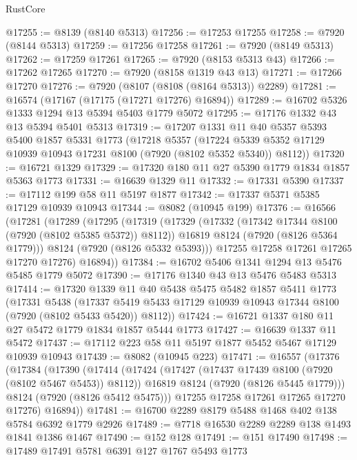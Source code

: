 \begin{lexlean}{RustCore}
\begin{coremodule}
@17255 := @8139 (@8140 @5313)
@17256 := @17253 @17255
@17258 := @7920 (@8144 @5313)
@17259 := @17256 @17258
@17261 := @7920 (@8149 @5313)
@17262 := @17259 @17261
@17265 := @7920 (@8153 @5313 @43)
@17266 := @17262 @17265
@17270 := @7920 (@8158 @1319 @43 @13)
@17271 := @17266 @17270
@17276 := @7920 (@8107 (@8108 (@8164 @5313)) @2289)
@17281 := @16574 (@17167 (@17175 (@17271 @17276) @16894))
@17289 := @16702 @5326 @1333 @1294 @13 @5394 @5403 @1779 @5072
@17295 := @17176 @1332 @43 @13 @5394 @5401 @5313
@17319 := @17207
    @1331
    @11
    @40
    @5357
    @5393
    @5400
    @1857
    @5331
    @1773
    (@17218
      @5357
      (@17224 @5339 @5352 @17129 @10939 @10943 @17231 @8100 (@7920 (@8102 @5352 @5340)) @8112))
@17320 := @16721 @1329
@17329 := @17320 @180 @11 @27 @5390 @1779 @1834 @1857 @5363 @1773
@17331 := @16639 @1329 @11
@17332 := @17331 @5390
@17337 := @17112 @199 @58 @11 @5197 @1877
@17342 := @17337 @5371 @5385 @17129 @10939 @10943
@17344 := @8082 (@10945 @199)
@17376 := @16566
    (@17281
      (@17289
        (@17295
          (@17319
            (@17329
              (@17332 (@17342 @17344 @8100 (@7920 (@8102 @5385 @5372)) @8112))
              @16819
              @8124
              (@7920 (@8126 @5364 @1779)))
            @8124
            (@7920 (@8126 @5332 @5393)))
          @17255
          @17258
          @17261
          @17265
          @17270
          @17276)
        @16894))
@17384 := @16702 @5406 @1341 @1294 @13 @5476 @5485 @1779 @5072
@17390 := @17176 @1340 @43 @13 @5476 @5483 @5313
@17414 := @17320
    @1339
    @11
    @40
    @5438
    @5475
    @5482
    @1857
    @5411
    @1773
    (@17331
      @5438
      (@17337 @5419 @5433 @17129 @10939 @10943 @17344 @8100 (@7920 (@8102 @5433 @5420)) @8112))
@17424 := @16721 @1337 @180 @11 @27 @5472 @1779 @1834 @1857 @5444 @1773
@17427 := @16639 @1337 @11 @5472
@17437 := @17112 @223 @58 @11 @5197 @1877 @5452 @5467 @17129 @10939 @10943
@17439 := @8082 (@10945 @223)
@17471 := @16557
    (@17376
      (@17384
        (@17390
          (@17414
            (@17424
              (@17427 (@17437 @17439 @8100 (@7920 (@8102 @5467 @5453)) @8112))
              @16819
              @8124
              (@7920 (@8126 @5445 @1779)))
            @8124
            (@7920 (@8126 @5412 @5475)))
          @17255
          @17258
          @17261
          @17265
          @17270
          @17276)
        @16894))
@17481 := @16700 @2289 @8179 @5488 @1468 @402 @138 @5784 @6392 @1779 @2926
@17489 := @7718 @16530 @2289 @2289 @138 @1493 @1841 @1386 @1467
@17490 := @152 @128
@17491 := @151 @17490
@17498 := @17489 @17491 @5781 @6391 @127 @1767 @5493 @1773

\end{coremodule}
\end{lexlean}
